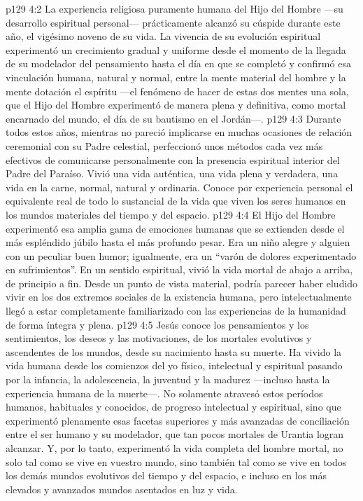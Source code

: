 \vs p129 4:2 La experiencia religiosa puramente humana del Hijo del Hombre ---su desarrollo espiritual personal--- prácticamente alcanzó su cúspide durante este año, el vigésimo noveno de su vida. La vivencia de su evolución espiritual experimentó un crecimiento gradual y uniforme desde el momento de la llegada de su modelador del pensamiento hasta el día en que se completó y confirmó esa vinculación humana, natural y normal, entre la mente material del hombre y la mente dotación el espíritu ---el fenómeno de hacer de estas dos mentes una sola, que el Hijo del Hombre experimentó de manera plena y definitiva, como mortal encarnado del mundo, el día de su bautismo en el Jordán---.
\vs p129 4:3 Durante todos estos años, mientras no pareció implicarse en muchas ocasiones de relación ceremonial con su Padre celestial, perfeccionó unos métodos cada vez más efectivos de comunicarse personalmente con la presencia espiritual interior del Padre del Paraíso. Vivió una vida auténtica, una vida plena y verdadera, una vida en la carne, normal, natural y ordinaria. Conoce por experiencia personal el equivalente real de todo lo sustancial de la vida que viven los seres humanos en los mundos materiales del tiempo y del espacio.
\vs p129 4:4 El Hijo del Hombre experimentó esa amplia gama de emociones humanas que se extienden desde el más espléndido júbilo hasta el más profundo pesar. Era un niño alegre y alguien con un peculiar buen humor; igualmente, era un “varón de dolores experimentado en sufrimientos”. En un sentido espiritual, vivió la vida mortal de abajo a arriba, de principio a fin. Desde un punto de vista material, podría parecer haber eludido vivir en los dos extremos sociales de la existencia humana, pero intelectualmente llegó a estar completamente familiarizado con las experiencias de la humanidad de forma íntegra y plena.
\vs p129 4:5 Jesús conoce los pensamientos y los sentimientos, los deseos y las motivaciones, de los mortales evolutivos y ascendentes de los mundos, desde su nacimiento hasta su muerte. Ha vivido la vida humana desde los comienzos del yo físico, intelectual y espiritual pasando por la infancia, la adolescencia, la juventud y la madurez ---incluso hasta la experiencia humana de la muerte---. No solamente atravesó estos períodos humanos, habituales y conocidos, de progreso intelectual y espiritual, sino que  experimentó plenamente esas facetas superiores y más avanzadas de conciliación entre el ser humano y su modelador, que tan pocos mortales de Urantia logran alcanzar. Y, por lo tanto, experimentó la vida completa del hombre mortal, no solo tal como se vive en vuestro mundo, sino también tal como se vive en todos los demás mundos evolutivos del tiempo y del espacio, e incluso en los más elevados y avanzados mundos asentados en luz y vida.
